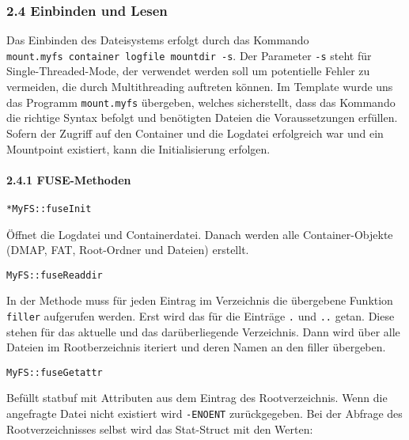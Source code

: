 \documentclass[]{article}
\let\oldparagraph\paragraph
\renewcommand{\paragraph}[1]{\oldparagraph{#1}\mbox{}}
\begin{document}
\hypertarget{einbinden-und-lesen}{%
\subsubsection{2.4 Einbinden und Lesen}\label{einbinden-und-lesen}}

Das Einbinden des Dateisystems erfolgt durch das Kommando
\texttt{mount.myfs\ container\ logfile\ mountdir\ -s}. Der Parameter
\texttt{-s} steht für Single-Threaded-Mode, der verwendet werden soll um
potentielle Fehler zu vermeiden, die durch Multithreading auftreten
können. Im Template wurde uns das Programm \texttt{mount.myfs}
übergeben, welches sicherstellt, dass das Kommando die richtige Syntax
befolgt und benötigten Dateien die Voraussetzungen erfüllen. Sofern der
Zugriff auf den Container und die Logdatei erfolgreich war und ein
Mountpoint existiert, kann die Initialisierung erfolgen.

\hypertarget{fuse-methoden}{%
\paragraph{2.4.1 FUSE-Methoden}\label{fuse-methoden}}

\texttt{*MyFS::fuseInit}

Öffnet die Logdatei und Containerdatei. Danach werden alle
Container-Objekte (DMAP, FAT, Root-Ordner und Dateien) erstellt.

\texttt{MyFS::fuseReaddir}

In der Methode muss für jeden Eintrag im Verzeichnis die übergebene
Funktion \texttt{filler} aufgerufen werden. Erst wird das für die
Einträge \texttt{.} und \texttt{..} getan. Diese stehen für das aktuelle
und das darüberliegende Verzeichnis. Dann wird über alle Dateien im
Rootberzeichnis iteriert und deren Namen an den filler übergeben.

\texttt{MyFS::fuseGetattr}

Befüllt statbuf mit Attributen aus dem Eintrag des Rootverzeichnis. Wenn
die angefragte Datei nicht existiert wird \texttt{-ENOENT}
zurückgegeben. Bei der Abfrage des Rootverzeichnisses selbst wird das
Stat-Struct mit den Werten:
\end{document}
